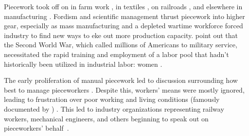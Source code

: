 \documentclass[trackingWork]{subfiles}
\begin{document}


Piecework took off on in farm work \cite{hughRaynbirdTaskWork},
in textiles \cite{restructuringPieceworkBaker,riisOtherSideLives},
on railroads \cite{Brown01041990}, and 
elsewhere in manufacturing \cite{10.2307/3827491}.
Fordism and scientific management thrust piecework into higher gear, especially as
mass manufacturing and
a depleted wartime workforce forced industry to find new ways to eke out more production capacity.
\citeauthor{hart2013rise} point out that the Second World War,
which called millions of Americans to military service,
necessitated the rapid training and employment of
a labor pool that hadn't historically been utilized in industrial labor: women
\cite{hart2013rise}.

The early proliferation of manual piecework led to discussion surrounding how best to manage pieceworkers
\cite{norton1900textile,clark1908cotton}.
Despite this, workers' means were mostly ignored,
leading to frustration over poor working and living conditions
(famously documented by
\citeauthor{riisOtherSideLives})
\cite{riisOtherSideLives}.
This led to industry organizations representing
railway workers, mechanical engineers, and others beginning to speak out on pieceworkers' behalf~\cite{american1921problem,richards1904anything}.
\end{document}
